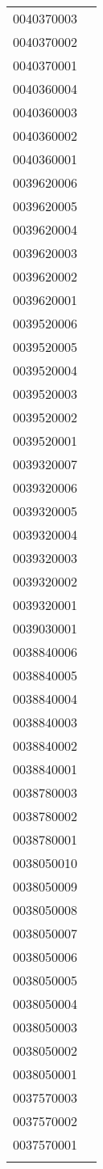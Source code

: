 \documentclass[a4paper]{report}
\begin{document}
\begin{longtable}{| p{4cm} | p{10cm} |}
	0040370003 & \\
	0040370002 & \\
	0040370001 & \\
	0040360004 & \\
	0040360003 & \\
	0040360002 & \\
	0040360001 & \\
	0039620006 & \\
	0039620005 & \\
	0039620004 & \\
	0039620003 & \\
	0039620002 & \\
	0039620001 & \\
	0039520006 & \\
	0039520005 & \\
	0039520004 & \\
	0039520003 & \\
	0039520002 & \\
	0039520001 & \\
	0039320007 & \\
	0039320006 & \\
	0039320005 & \\
	0039320004 & \\
	0039320003 & \\
	0039320002 & \\
	0039320001 & \\
	0039030001 & \\
	0038840006 & \\
	0038840005 & \\
	0038840004 & \\
	0038840003 & \\
	0038840002 & \\
	0038840001 & \\
	0038780003 & \\
	0038780002 & \\
	0038780001 & \\
	0038050010 & \\
	0038050009 & \\
	0038050008 & \\
	0038050007 & \\
	0038050006 & \\
	0038050005 & \\
	0038050004 & \\
	0038050003 & \\
	0038050002 & \\
	0038050001 & \\
	0037570003 & \\
	0037570002 & \\
	0037570001 & \\
	 & \\


\end{longtable}
\end{document}
